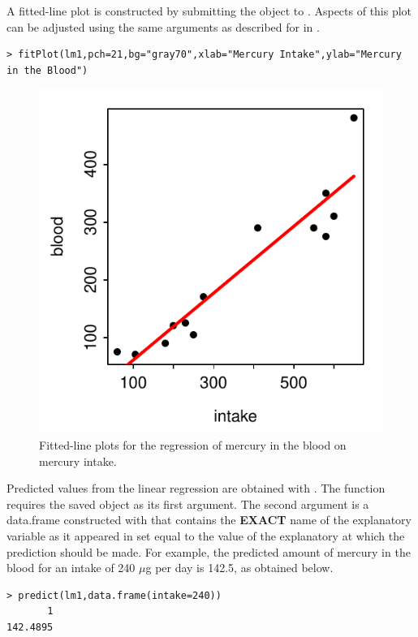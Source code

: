 \documentclass[10pt,openany]{book}\usepackage[]{graphicx}\usepackage[]{color}
\makeatletter
\newenvironment{kframe}{%
 \def\at@end@of@kframe{}%
 \ifinner\ifhmode%
  \def\at@end@of@kframe{\end{minipage}}%
  \begin{minipage}{\columnwidth}%
 \fi\fi%
 \def\FrameCommand##1{\hskip\@totalleftmargin \hskip-\fboxsep
 \colorbox{shadecolor}{##1}\hskip-\fboxsep
     \hskip-\linewidth \hskip-\@totalleftmargin \hskip\columnwidth}%
 \MakeFramed {\advance\hsize-\width
   \@totalleftmargin\z@ \linewidth\hsize
   \@setminipage}}%
 {\par\unskip\endMakeFramed%
 \at@end@of@kframe}
\newenvironment{knitrout}{}{} %
\makeatother
\begin{document}
A fitted-line plot  is constructed by submitting the  object to . Aspects of this plot can be adjusted using the same arguments as described for  in .
\begin{knitrout}
\color{fgcolor}\begin{kframe}
\begin{verbatim}
> fitPlot(lm1,pch=21,bg="gray70",xlab="Mercury Intake",ylab="Mercury in the Blood")
\end{verbatim}
\end{kframe}\begin{figure}[hbtp]

{\centering \includegraphics[width=.4\linewidth]{Figs/HGFLP-1} 

}

\caption[Fitted-line plots for the regression of mercury in the blood on mercury intake]{Fitted-line plots for the regression of mercury in the blood on mercury intake.}\label{fig:HGFLP}
\end{figure}


\end{knitrout}

Predicted values from the linear regression are obtained with . The  function requires the saved  object as its first argument. The second argument is a data.frame constructed with  that contains the \textbf{EXACT} name of the explanatory variable as it appeared in  set equal to the value of the explanatory at which the prediction should be made. For example, the predicted amount of mercury in the blood for an intake of 240 $\mu$g per day is 142.5, as obtained below.
\begin{knitrout}
\color{fgcolor}\begin{kframe}
\begin{verbatim}
> predict(lm1,data.frame(intake=240))
       1 
142.4895 
\end{verbatim}
\end{kframe}
\end{knitrout}
\end{document}
